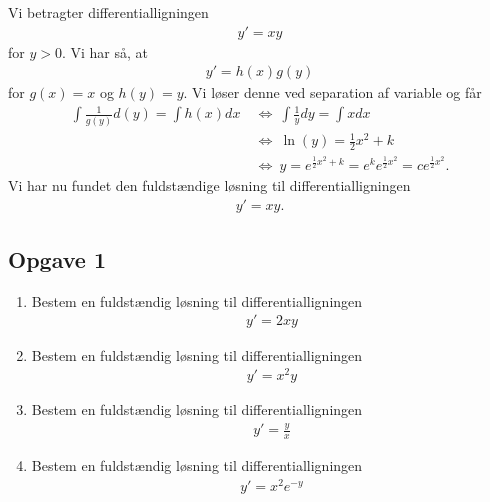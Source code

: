 \begin{exa}
	Vi betragter differentialligningen
	\begin{align*}
		y' = xy
	\end{align*}
	for $y>0$. 
	Vi har så, at 
	\begin{align*}
		y' = h(x)g(y)
	\end{align*}
	for $g(x) =x $ og $h(y) = y$. Vi løser denne ved separation af variable og får
	\begin{align*}
	\int \frac{1}{g(y)}d(y) = \int h(x) dx  \ &\Leftrightarrow \ \int \frac{1}{y} dy = \int x dx\\
	&\Leftrightarrow \ \ln(y) = \frac{1}{2}x^2 + k \\
	& \Leftrightarrow \ y = e^{\frac{1}{2}x^2+k} = e^{k}e^{\frac{1}{2}x^2} = ce^{\frac{1}{2}x^2}.
	\end{align*}
	Vi har nu fundet den fuldstændige løsning til differentialligningen 
	\begin{align*}
		y' = xy.
	\end{align*}
\end{exa}

\subsection*{Opgave 1}
\begin{enumerate}[label=\roman*)]
	\item Bestem en fuldstændig løsning til differentialligningen 
	\begin{align*}
		y' = 2xy
	\end{align*}
	\item  Bestem en fuldstændig løsning til differentialligningen 
	\begin{align*}
		y' = x^2y
	\end{align*}
	 \item Bestem en fuldstændig løsning til differentialligningen 
	\begin{align*}
		y' = \frac{y}{x}
	\end{align*}
	\item Bestem en fuldstændig løsning til differentialligningen 
	\begin{align*}
		y' = x^2e^{-y}
	\end{align*}
\end{enumerate}

